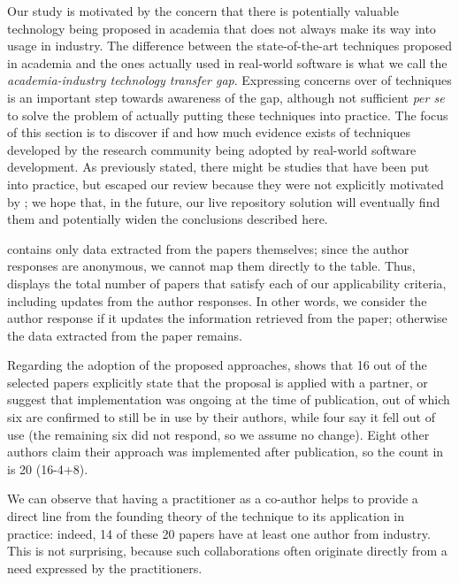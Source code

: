 Our study is motivated by the concern that there is potentially valuable technology being proposed in academia that does not always make its way into usage in industry.
The difference between the state-of-the-art techniques proposed in academia and the ones actually used in real-world software is what we call the \emph{academia-industry technology transfer gap}.
Expressing concerns over \rea of \rt techniques is an important step towards awareness of the gap, although not sufficient \textit{per se} to solve the problem of actually putting these techniques into practice.
The focus of this section is to discover if and how much evidence exists of techniques developed by the research community being adopted by real-world software development.
As previously stated, there might be studies that have been put into practice, but escaped our review because they were not explicitly motivated by \rea; we hope that, in the future, our live repository solution will eventually find them and potentially widen the conclusions described here.

 contains only data extracted from the papers themselves; since the author responses are anonymous, we cannot map them directly to the table.
Thus,~ displays the total number of papers that satisfy each of our applicability criteria, including updates from the author responses.
In other words, we consider the author response if it updates the information retrieved from the paper; otherwise the data extracted from the paper remains.



Regarding the adoption of the proposed approaches,  shows that 16 out of the \numpapers selected papers explicitly state that the proposal is applied with a partner, or suggest that implementation was ongoing at the time of publication, out of which six are confirmed to still be in use by their authors, while four say it fell out of use (the remaining six did not respond, so we assume no change).
Eight other authors claim their approach was implemented after publication, so the count in~ is 20 (16-4+8).

We can observe that having a practitioner as a co-author helps to provide a direct line from the founding theory of the technique to its application in practice: 
indeed, 14 of these 20 papers have at least one author from industry.
This is not surprising, because such collaborations often originate directly from a need expressed by the practitioners.

